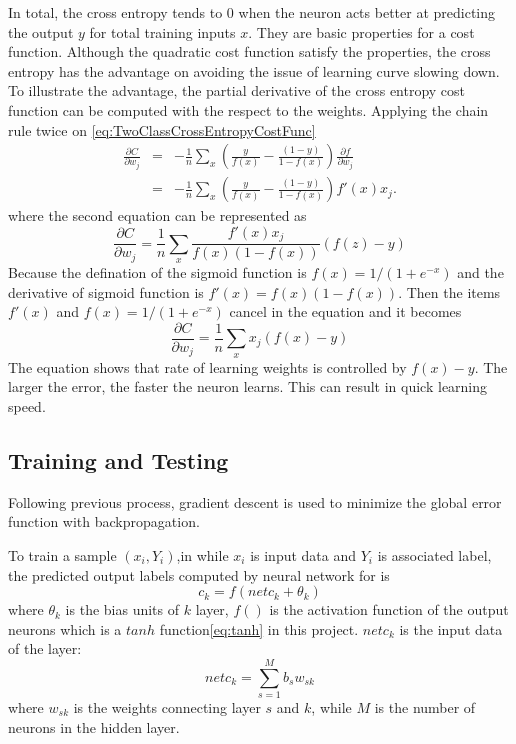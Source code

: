 In total, the cross entropy tends to $0$ when the neuron acts better at predicting the output $y$ for total training inputs $x$. They are basic properties for a cost function. Although the quadratic cost function satisfy the properties, the cross entropy has the advantage on avoiding the issue of learning curve slowing down. To illustrate the advantage, the partial derivative of the cross entropy cost function can be computed with the respect to the weights. Applying the chain rule twice on \ref{eq:TwoClassCrossEntropyCostFunc}
\begin{eqnarray}\label{eq:DerCrossEntropyCostFunc}
  \frac{\partial C}{\partial w_j} & = & -\frac{1}{n} \sum_x \left(
    \frac{y }{f(x)} -\frac{(1-y)}{1-f(x)} \right)
  \frac{\partial f}{\partial w_j} \\
 & = & -\frac{1}{n} \sum_x \left( 
    \frac{y}{f(x)}-\frac{(1-y)}{1-f(x)} \right)f'(x) x_j.
\end{eqnarray}
where the second equation can be represented as
\begin{equation}\label{eq:SecondDerCrossEntropyCostFunc}
  \frac{\partial C}{\partial w_j} = \frac{1}{n}  \sum_x \frac{f'(x) x_j}{f(x) (1-f(x))} (f(z)-y)
\end{equation}
Because the defination of the sigmoid function is $f(x) =1/(1+e^{-x})$ and the derivative of sigmoid function is $f'(x) =f(x)(1-f(x))$. Then the items $f'(x)$ and $f(x) =1/(1+e^{-x})$ cancel in the equation and it becomes
\begin{equation}\label{eq:SimDerCrossEntropyCostFunc}
 \frac{\partial C}{\partial w_j} =  \frac{1}{n} \sum_x x_j(f(x)-y)
\end{equation}
The equation shows that rate of learning weights is controlled by $f(x) - y$. The larger the error, the faster the neuron learns. This can result in quick learning speed. 
\subsection{Training and Testing}

Following previous process, gradient descent is used to minimize the global error function with backpropagation. 

To train a sample $(x_{i}, Y_{i})$,in while $x_{i}$ is input data and $Y_{i}$ is associated label, the predicted output labels computed by neural network for is
\begin{equation}\label{eq:MultiLabelActivation}
c_{k} = f(netc_{k} + \theta_{k})
\end{equation}
where $\theta_{k}$ is the bias units of $k$ layer, $f()$ is the activation function of the output neurons which is a $tanh$ function\ref{eq:tanh} in this project. $netc_{k}$ is the input data of the layer:
\begin{equation}\label{eq:MultiLabel}
netc_{k} = \sum_{s=1}^M b_{s}w_{sk}
\end{equation}
where $w_{sk}$ is the weights connecting layer $s$ and $k$, while $M$ is the number of neurons in the hidden layer.

